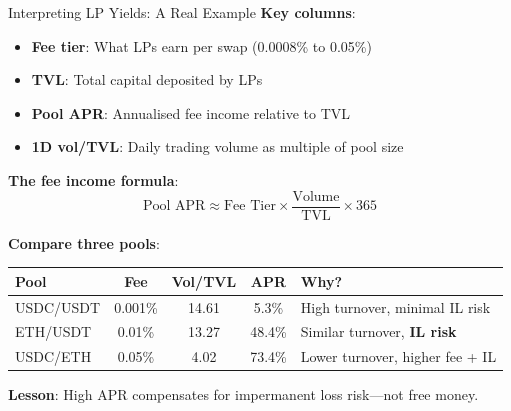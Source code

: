 \documentclass[10pt]{beamer}
\newcommand{\highlight}[1]{\textcolor{AccentOrange}{\textbf{#1}}}
\begin{document}
\begin{frame}{Interpreting LP Yields: A Real Example}
  \textbf{Key columns}:
  \begin{itemize}
    \item \textbf{Fee tier}: What LPs earn per swap (0.0008\% to 0.05\%)
    \item \textbf{TVL}: Total capital deposited by LPs
    \item \textbf{Pool APR}: Annualised fee income relative to TVL
    \item \textbf{1D vol/TVL}: Daily trading volume as multiple of pool size
  \end{itemize}
  
  \vspace{0.5em}
  \textbf{The fee income formula}:
  \[
  \text{Pool APR} \approx \text{Fee Tier} \times \frac{\text{Volume}}{\text{TVL}} \times 365
  \]
  
  \vspace{0.5em}
  \textbf{Compare three pools}:
  \begin{center}
  \small
  \begin{tabular}{lcccl}
    \toprule
    \textbf{Pool} & \textbf{Fee} & \textbf{Vol/TVL} & \textbf{APR} & \textbf{Why?} \\
    \midrule
    USDC/USDT & 0.001\% & 14.61 & 5.3\% & High turnover, minimal IL risk \\
    ETH/USDT & 0.01\% & 13.27 & 48.4\% & Similar turnover, \highlight{IL risk} \\
    USDC/ETH & 0.05\% & 4.02 & 73.4\% & Lower turnover, higher fee + IL \\
    \bottomrule
  \end{tabular}
  \end{center}
  
  \vspace{0.3em}
  \textbf{Lesson}: High APR compensates for impermanent loss risk---not free money.
\end{frame}
\end{document}
